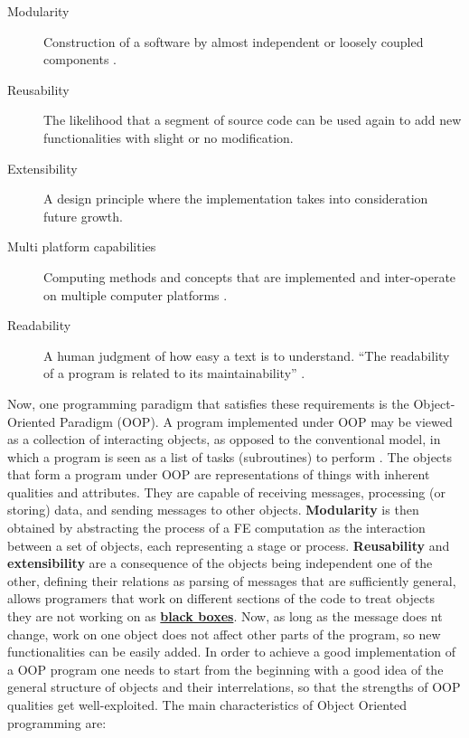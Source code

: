 \begin{description}
\item[Modularity] Construction of a software by almost independent or loosely coupled components \cite{Lage1998}.
\item[Reusability]  The likelihood that a segment of source code can be used again to add new functionalities with slight or no modification. 
\item[Extensibility] A design principle where the implementation takes into consideration future growth.
\item [Multi platform capabilities]  Computing methods and concepts that are implemented and inter-operate on multiple computer platforms \cite{PCMag}.
\item[Readability]  A human judgment of how easy a
text is to understand. ``The readability of a program is related
to its maintainability'' \cite{Raymond2008}.
\end{description}

Now, one programming paradigm that satisfies these requirements is the Object-Oriented Paradigm (OOP). A program implemented under OOP may be viewed as a collection of interacting objects, as opposed to the conventional model, in which a program is seen as a list of tasks (subroutines) to perform \cite{Wikipedia2013}.
The objects that form a program under OOP are representations of things with inherent qualities and attributes. They are capable of receiving messages, processing (or storing) data, and sending messages to other objects. \textbf{Modularity} is then obtained by abstracting the process of a FE computation as the interaction between a set of objects, each representing a stage or process. \textbf{Reusability} and \textbf{extensibility} are a consequence of the objects being independent one of the other, defining their relations as parsing of messages that are sufficiently general, allows programers that work on different sections of the code to treat objects they are not working on as \href{http://en.wikipedia.org/wiki/Black_box}{\textbf{black boxes}}. Now, as long as the message does nt change, work on one object does not affect other parts of the program, so new functionalities can be easily added. In order to achieve a good implementation of a OOP program one needs to start from the beginning with a good idea of the general structure of objects and their interrelations, so that the strengths of OOP qualities get well-exploited. 
The main characteristics of Object Oriented programming are:

